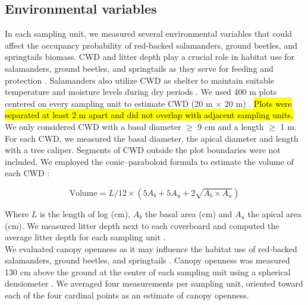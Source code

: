 \subsection*{Environmental variables}
\label{subsec:Envar}

In each sampling unit, we measured several environmental variables that could affect the occupancy probability of red-backed salamanders, ground beetles, and springtails biomass.
CWD and litter depth play a crucial role in habitat use for salamanders, ground beetles, and springtails as
they serve for feeding and protection \citep{harmonEcologyCoarseWoody1986,koivula.LeafLitterSmallscale1999,birdChangesSoilLitter2004,McKenny2006Effectsstructural}. 
Salamanders also utilize CWD as shelter to maintain suitable temperature and moisture levels during dry periods \citep{Jaeger1980MicrohabitatsTerrestrial,groverInfluenceCoverMoisture1998a,patrickEffectsExperimentalForestry2006a}. 
We used 400 m plots centered on every sampling unit to estimate CWD (20 m $\times$  20 m) \citep{methotGuideInventaireEchantillonnage2014}. 
\hl{Plots were separated at least 2 m apart and did not overlap with adjacent sampling units. }
We only considered CWD with a basal diameter $\geq$ 9 cm and a length $\geq$ 1 m. 
For each CWD, we measured the basal diameter, the apical diameter and length with a tree caliper. 
Segments of CWD outside the plot boundaries were not included. 
We employed the conic–paraboloid formula to estimate the volume of each CWD \citep{fraverRefiningVolumeEstimates2007} :

\begin{equation}
  \text{Volume} = L/12 \times (5A_b + 5A_u + 2\sqrt{A_b \times A_u})
\end{equation}

\vspace{0.5cm}

Where $L$ is the length of log (cm), $A_b$ the basal area (cm) and $A_u$ the apical area (cm).
We measured litter depth next to each coverboard and computed the average litter depth for each sampling unit \citep{Mazerolle2021Woodlandsalamander}. \\
We evaluated canopy openness as it may influence the habitat use of red-backed salamanders, ground beetles, and springtails \citep{messereForestFloorDistribution1998,koivulaBorealCarabidbeetleColeoptera2002a,tilghmanMetaanalysisEffectsCanopy2012,henneronForestPlantCommunity2017}.
Canopy openness was measured 130 cm above the ground at the center of each sampling unit using a spherical densiometer \citep{lemmonSphericalDensiometerEstimating1956}. 
We averaged four measurements per sampling unit, oriented toward each of the four cardinal points as an estimate of canopy openness.

